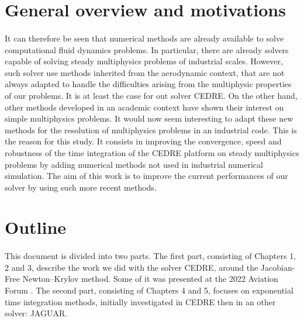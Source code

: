   \section*{General overview and motivations}

    \paragraph{}
    It can therefore be seen that numerical methods are already available to solve computational fluid dynamics problems.
    In particular, there are already solvers capable of solving steady multiphysics problems of industrial scales.
    However, such solver use methods inherited from the aerodynamic context, that are not always adapted to handle the difficulties arising from the multiphysic properties of our problems.
    It is at least the case for out solver CEDRE.
    On the other hand, other methods developed in an academic context have shown their interest on simple multiphysics problems.
    It would now seem interesting to adapt these new methods for the resolution of multiphysics problems in an industrial code.
    This is the reason for this study.
    It consists in improving the convergence, speed and robustness of the time integration of the CEDRE platform on steady multiphysics problems by adding numerical methods not used in industrial numerical simulation.
    The aim of this work is to improve the current performances of our solver by using such more recent methods.


  \section*{Outline}

    \paragraph{}
    This document is divided into two parts.
    The first part, consisting of Chapters 1, 2 and 3, describe the work we did with the solver CEDRE, around the Jacobian-Free Newton--Krylov method.
    Some of it was presented at the 2022 Aviation Forum \cite{SeizeMatuszewskiPuigt}.
    The second part, consisting of Chapters 4 and 5, focuses on exponential time integration methods, initially investigated in CEDRE then in an other solver: JAGUAR.


